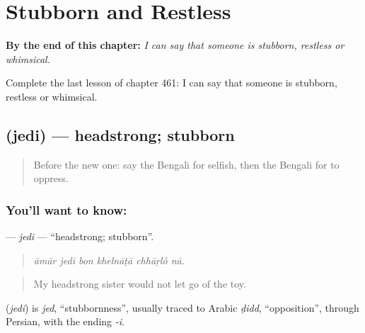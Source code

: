 
\chapter{Stubborn and Restless}
\label{ch:bn-stubborn-and-restless}

\begin{chapteropening}
\textbf{By the end of this chapter:} \emph{I can say that someone is stubborn, restless or whimsical.}

Complete the last lesson of chapter 461: I can say that someone is stubborn, restless or whimsical.
\end{chapteropening}

\section[\texorpdfstring{\bn{জেদি} (jedi)}{জেদি (jedi)}]{ (jedi) — headstrong; stubborn}

\label{lesson:BN-C461-jedi}



\begin{quote}
Before the new one: say the Bengali for selfish, then the Bengali for to oppress.
\end{quote}

\subsection*{You'll want to know: }
\textbf{} — \emph{jedi} — \textquotedblleft{}headstrong; stubborn\textquotedblright{}.

\begin{quote}
     
\end{quote}

\begin{quote}
\emph{āmār jedi bon khelnāṭā chhāṛlô nā.}
\end{quote}

\begin{quote}
My headstrong sister would not let go of the toy.
\end{quote}

\begin{cousinweb}
\textbf{} (\emph{jedi}) is \emph{jed}, \textquotedblleft{}stubbornness\textquotedblright{}, usually traced to Arabic \emph{ḍidd}, \textquotedblleft{}opposition\textquotedblright{}, through Persian, with the ending \emph{-i}.
\end{cousinweb}


